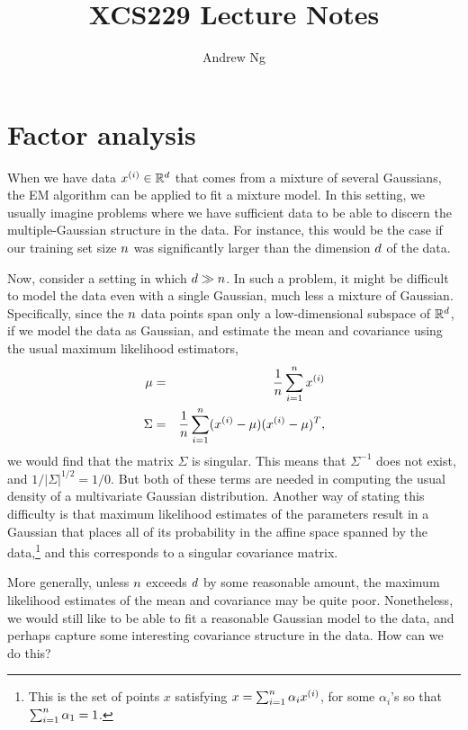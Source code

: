 \documentclass{article}
\begin{document}
\title{XCS229 Lecture Notes}
\author{Andrew Ng}
\date{}
\maketitle

\setcounter{part}{9}
\part{Factor analysis}

When we have data ${x^{(i)}}\in {\mathbb R}^{d}$ that comes from a mixture of several Gaussians,
the EM algorithm can be applied to fit a mixture model.  In this
setting, we usually imagine problems where we have sufficient data
to be able to discern the multiple-Gaussian structure in the data.  For instance,
this would be the case if our training set size ${n}$ was significantly
larger than the dimension ${d}$ of the data.

Now, consider a setting in which ${d} \gg {n}$.
In such a problem, it might be difficult to model
the data even with a single Gaussian, much less a mixture of Gaussian. Specifically,
since the ${n}$ data points span only a low-dimensional subspace of ${\mathbb R}^{d}$, if we model
the data as Gaussian, and estimate the mean and covariance using the usual
maximum likelihood estimators,
\begin{eqnarray*}
\mu &=& \frac{1}{{n}}\sum_{i=1}^{n} {x^{(i)}}  \\
\Sigma &=& \frac{1}{{n}}\sum_{i=1}^{n} ({x^{(i)}} -\mu) ({x^{(i)}} -\mu)^T,
\end{eqnarray*}
we would find that the matrix $\Sigma$ is singular.  This means that $\Sigma^{-1}$
does not exist, and $1/|\Sigma|^{1/2} = 1/0$. But both of these terms are needed
in computing the usual density of a multivariate Gaussian distribution.  Another way
of stating this difficulty is that maximum likelihood estimates of the parameters
result in a Gaussian that places all of its probability in the affine space spanned
by the data,\footnote{This is the set of points $x$ satisfying $x = \sum_{i=1}^{n} \alpha_i {x^{(i)}}$,
for some $\alpha_i$'s so that $\sum_{i=1}^{n} \alpha_1 = 1$.} and this corresponds to a singular
covariance matrix.

More generally, unless ${n}$ exceeds ${d}$ by some reasonable amount, the maximum likelihood
estimates of the mean and covariance may be quite poor.  Nonetheless, we would still like to
be able to fit a reasonable Gaussian model to the data, and perhaps capture some
interesting covariance structure in the data.  How can we do this?
\end{document}
